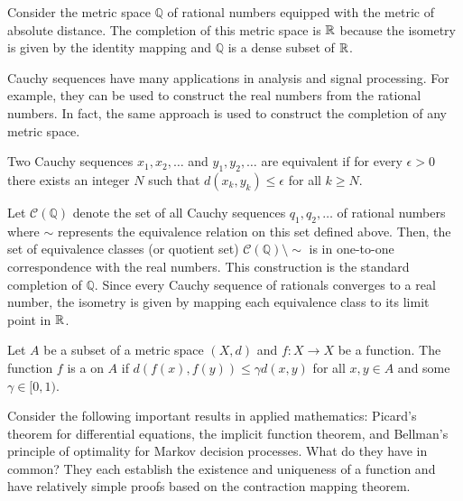 \begin{example}
Consider the metric space $\mathbb{Q}$ of rational numbers equipped with the metric of absolute distance.
The completion of this metric space is $\mathbb{R}$ because the isometry is given by the identity mapping and $\mathbb{Q}$ is a dense subset of $\mathbb{R}$.
\end{example}

Cauchy sequences have many applications in analysis and signal processing.
For example, they can be used to construct the real numbers from the rational numbers.
In fact, the same approach is used to construct the completion of any metric space.

\begin{definition}
Two Cauchy sequences $x_1, x_2, \ldots$ and $y_1, y_2, \ldots$ are equivalent if for every $\epsilon >0$ there exists an integer $N$ such that $d (x_k, y_k) \leq \epsilon$ for all $k \geq N$.
\end{definition}

\begin{example}
Let $\mathcal{C}(\mathbb{Q})$ denote the set of all Cauchy sequences $q_1, q_2, \ldots$ of rational numbers where $\sim$ represents the equivalence relation on this set defined above.
Then, the set of equivalence classes (or quotient set) $\mathcal{C}(\mathbb{Q}) \setminus \!\! \sim$ is in one-to-one correspondence with the real numbers.
This construction is the standard completion of $\mathbb{Q}$.
Since every Cauchy sequence of rationals converges to a real number, the isometry is given by mapping each equivalence class to its limit point in $\mathbb{R}$.
\end{example}

\begin{definition}
Let $A$ be a subset of a metric space $(X,d)$ and $f: X \rightarrow X$ be a function.
The function $f$ is a  on $A$ if $d \left( f(x),f(y) \right) \leq \gamma  d(x,y)$ for all $x,y\in A$ and some $\gamma \in [0,1)$.
\end{definition}

Consider the following important results in applied mathematics: Picard's theorem for differential equations, the implicit function theorem, and Bellman's principle of optimality for Markov decision processes.
What do they have in common?
They each establish the existence and uniqueness of a function and have relatively simple proofs based on the contraction mapping theorem.


